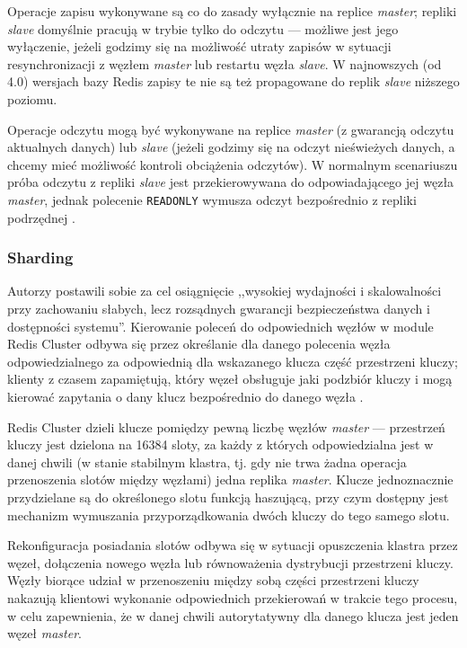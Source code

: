 Operacje zapisu wykonywane są co do zasady wyłącznie na replice \textit{master}; repliki \textit{slave} domyślnie pracują w trybie tylko do odczytu --- możliwe jest jego wyłączenie, jeżeli godzimy się na możliwość utraty zapisów w sytuacji resynchronizacji z węzłem \textit{master} lub restartu węzła \textit{slave}. W najnowszych (od 4.0) wersjach bazy Redis zapisy te nie są też propagowane do replik \textit{slave} niższego poziomu.

Operacje odczytu mogą być wykonywane na replice \textit{master} (z gwarancją odczytu aktualnych danych) lub \textit{slave} (jeżeli godzimy się na odczyt nieświeżych danych, a chcemy mieć możliwość kontroli obciążenia odczytów). W normalnym scenariuszu próba odczytu z repliki \textit{slave} jest przekierowywana do odpowiadającego jej węzła \textit{master}, jednak polecenie \texttt{READONLY} wymusza odczyt bezpośrednio z repliki podrzędnej \cite{rediscluster}.


\subsubsection*{Sharding}

Autorzy postawili sobie za cel osiągnięcie ,,wysokiej wydajności i skalowalności przy zachowaniu słabych, lecz rozsądnych gwarancji bezpieczeństwa danych i dostępności systemu''. Kierowanie poleceń do odpowiednich węzłów w module Redis Cluster odbywa się przez określanie dla danego polecenia węzła odpowiedzialnego za odpowiednią dla wskazanego klucza część przestrzeni kluczy; klienty z czasem zapamiętują, który węzeł obsługuje jaki podzbiór kluczy i mogą kierować zapytania o dany klucz bezpośrednio do danego węzła \cite{rediscluster}.

Redis Cluster dzieli klucze pomiędzy pewną liczbę węzłów \textit{master} --- przestrzeń kluczy jest dzielona na 16384 sloty, za każdy z których odpowiedzialna jest w danej chwili (w stanie stabilnym klastra, tj. gdy nie trwa żadna operacja przenoszenia slotów między węzłami) jedna replika \textit{master}. Klucze jednoznacznie przydzielane są do określonego slotu funkcją haszującą, przy czym dostępny jest mechanizm wymuszania przyporządkowania dwóch kluczy do tego samego slotu.

Rekonfiguracja posiadania slotów odbywa się w sytuacji opuszczenia klastra przez węzeł, dołączenia nowego węzła lub równoważenia dystrybucji przestrzeni kluczy. Węzły biorące udział w przenoszeniu między sobą części przestrzeni kluczy nakazują klientowi wykonanie odpowiednich przekierowań w trakcie tego procesu, w celu zapewnienia, że w danej chwili autorytatywny dla danego klucza jest jeden węzeł \textit{master}.

